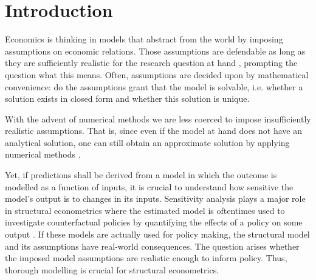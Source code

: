 \section{Introduction} \label{intro}


Economics is thinking in models that abstract from the world by imposing assumptions on economic relations. Those assumptions are defendable as long as they are sufficiently realistic for the research question at hand \citep{F53}, prompting the question what this means. Often, assumptions are decided upon by mathematical convenience: do the assumptions grant that the model is solvable, i.e. whether a solution exists in closed form and whether this solution is unique.



With the advent of numerical methods we are less coerced to impose insufficiently realistic assumptions. That is, since even if the model at hand does not have an analytical solution, one can still obtain an approximate solution by applying numerical methods \citep{MF04}.


Yet, if predictions shall be derived from a model in which the outcome is modelled as a function of inputs, it is crucial to understand how sensitive the model’s output is to changes in its inputs. Sensitivity analysis plays a major role in structural econometrics where the estimated model is oftentimes used to investigate counterfactual policies by quantifying the effects of a policy on some output \citep{LM17}. If these models are actually used for policy making, the structural model and its assumptions have real-world consequences. The question arises whether the imposed model assumptions are realistic enough to inform policy. Thus, thorough modelling is crucial for structural econometrics.

